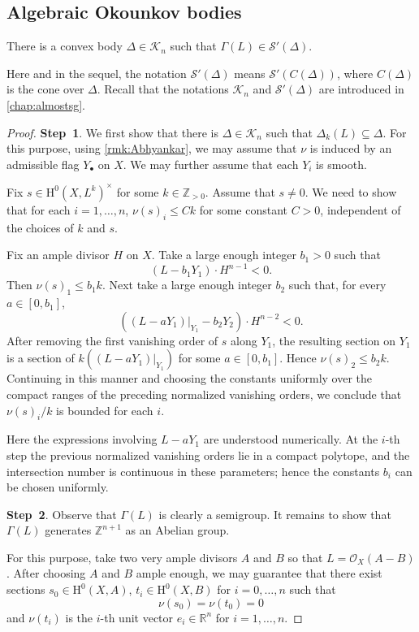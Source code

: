 \subsection{Algebraic Okounkov bodies}
\begin{proposition}\label{prop:Okounbiglbdl}
    There is a convex body $\Delta\in \mathcal{K}_n$ such that $\Gamma(L)\in \mathcal{S}'(\Delta)$.
\end{proposition}
Here and in the sequel, the notation $\mathcal{S}'(\Delta)$ means $\mathcal{S}'(C(\Delta))$, where $C(\Delta)$ is the cone over $\Delta$.
Recall that the notations $\mathcal{K}_n$ and $\mathcal{S}'(\Delta)$ are introduced in \cref{chap:almostsg}.

\begin{proof}
\textbf{Step~1}. We first show that there is $\Delta\in \mathcal{K}_n$ such that $\Delta_k(L)\subseteq \Delta$. For this purpose, using \cref{rmk:Abhyankar}, we may assume that $\nu$ is induced by an admissible flag $Y_{\bullet}$ on $X$. We may further assume that each $Y_i$ is smooth.


Fix $s\in \mathrm{H}^0(X,L^k)^{\times}$ for some $k\in \mathbb{Z}_{>0}$. Assume that $s\neq 0$. We need to show that for each $i=1,\ldots,n$, $\nu(s)_i\leq Ck$ for some constant $C>0$, independent of the choices of $k$ and $s$.

Fix an ample divisor $H$ on $X$. Take a large enough integer $b_1>0$ such that
\[
    (L-b_1 Y_1)\cdot H^{n-1}<0.
\]
Then $\nu(s)_1\leq b_1 k$. Next take a large enough integer $b_2$ such that, for every $a\in[0,b_1]$,
\[
\left((L-aY_1)|_{Y_1}-b_2Y_2\right) \cdot H^{n-2}<0.
\]
After removing the first vanishing order of $s$ along $Y_1$, the resulting section on $Y_1$ is a section of $k((L-aY_1)|_{Y_1})$ for some $a\in[0,b_1]$. Hence $\nu(s)_2\leq b_2k$. Continuing in this manner and choosing the constants uniformly over the compact ranges of the preceding normalized vanishing orders, we conclude that $\nu(s)_i/k$ is bounded for each $i$.

Here the expressions involving $L-aY_1$ are understood numerically. At the $i$-th step the previous normalized vanishing orders lie in a compact polytope, and the intersection number is continuous in these parameters; hence the constants $b_i$ can be chosen uniformly.

\textbf{Step~2}. Observe that $\Gamma(L)$ is clearly a semigroup. It remains to show that $\Gamma(L)$ generates $\mathbb{Z}^{n+1}$ as an Abelian group.

For this purpose, take two very ample divisors $A$ and $B$ so that $L=\mathcal{O}_X(A-B)$. After choosing $A$ and $B$ ample enough, we may guarantee that there exist sections $s_0\in \mathrm{H}^0(X,A)$, $t_i\in \mathrm{H}^0(X,B)$ for $i=0,\dots,n$ such that
\[
\nu(s_0)=\nu(t_0)=0
\]
and $\nu(t_i)$ is the $i$-th unit vector $e_i\in \mathbb{R}^n$ for $i=1,\ldots,n$.


\end{proof}
